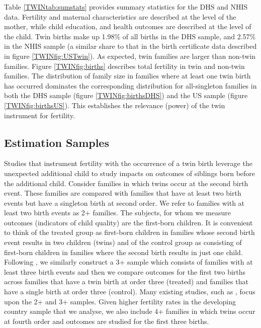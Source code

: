 \documentclass[subeqn]{article}
\begin{document}
\begin{spacing}{1.4}
Table \ref{TWINtab:sumstats} provides summary statistics for the DHS and NHIS data.
Fertility and maternal characteristics are described at
the level of the mother, while child education, and health outcomes are
described at the level of the child. Twin births make up 1.98\% of all births
in the DHS sample, and 2.57\% in the NHIS sample (a similar share to that in the
birth certificate data described in  figure \ref{TWINfig:USTwin}). As expected,
twin families are larger than non-twin families. Figure \ref{TWINfig:births}
describes total fertility in twin and non-twin families. The distribution of
family size in families where at least one twin birth has occurred dominates the
corresponding distribution for all-singleton families in both the DHS sample
(figure \ref{TWINfig:birthsDHS}) and the US sample (figure \ref{TWINfig:birthsUS}).
This establishes the relevance (power) of the twin instrument for fertility. 

\subsection{Estimation Samples}                    \label{TWINsscn:samples}
Studies that instrument fertility with the occurrence of a twin birth leverage the 
unexpected additional child to study impacts on outcomes of siblings born before the 
additional child. Consider families in which twins occur at the second birth event. These families are compared with families that have at least two
birth events but have a singleton birth at second order. We refer to families with at least two birth events as 2+ families. The subjects, for whom we measure outcomes (indicators of child quality) are the first-born children. It is convenient to think of the treated group as first-born children in families whose second birth event results in two children (twins) and of the control group as consisting of first-born children in families where the second birth results in just one child. Following \citet{Blacketal2005}, we similarly construct a 3+ sample which consists of families with at least three birth events and then we compare outcomes for the first two births across families that have a twin birth at order three (treated) and families that have a single birth at order three (control). Many existing studies, such as \citet{Angristetal2010}, focus upon the 2+ and 3+ samples. Given higher fertility rates in the developing country sample that we analyse, we also include 4+ families in which twins occur at fourth order and outcomes are studied for the first three births.


\end{spacing}
\end{document}
